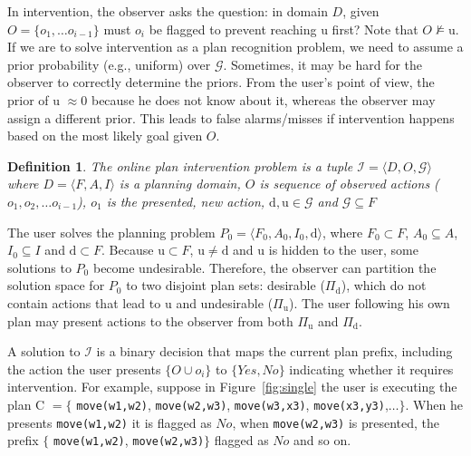 \documentclass[doctor]{thesis} %
\theoremstyle{plain}
\newtheorem{definition}{Definition}
\begin{document}
In intervention, the observer asks the question: in domain $D$, given $O = \lbrace o_1, \ldots o_{i-1}\rbrace$ must $o_i$ be flagged to prevent reaching $\mathrm{u}$ first?
Note that $O\not\models\mathrm{u}$. 
If we are to solve intervention as a plan recognition problem, we need to assume a prior probability (e.g., uniform) over $\mathcal{G}$. Sometimes, it may be hard for the observer to correctly determine the priors. From the user's point of view, the prior of $\mathrm{u}$ $\approx 0$ because he does not know about it, whereas the observer may assign a different prior. This leads to false alarms/misses if intervention happens based on the most likely goal given $O$.


\theoremstyle{definition}
\begin{definition}
The \textnormal{online plan intervention problem} is a tuple $\mathcal{I} = \langle D, O, \mathcal{G} \rangle$ where $D=\langle F, A, I \rangle$ is a planning domain, 
$O$ is  sequence of observed actions ($o_1, o_2, \ldots o_{i-1}$), $o_1$ is the presented, new action, $\mathrm{d},\mathrm{u} \in \mathcal{G}$ and $\mathcal{G} \subseteq F$
\end{definition}
The user solves the planning problem $P_0=\langle F_0, A_0, I_0,\mathrm{d}\rangle$, where $F_0 \subset F$, $A_0\subseteq A$, $I_0 \subseteq I$ and $\mathrm{d}\subset F$. 
Because $\mathrm{u}\subset F$, $\mathrm{u}\neq \mathrm{d}$ and $\mathrm{u}$ is hidden to the user, some solutions to $P_0$ become undesirable. Therefore, the observer can partition the solution space for $P_0$ to two disjoint plan sets: desirable ($\Pi_{\mathrm{d}}$), which do not contain actions that lead to $\mathrm{u}$ and undesirable ($\Pi_{\mathrm{u}}$). The user following his own plan may present actions to the observer from both $\Pi_{\mathrm{u}}$ and $\Pi_{\mathrm{d}}$. 

A solution to $\mathcal{I}$ is a binary decision that maps the current plan prefix, including the action the user presents $\lbrace O\cup o_i\rbrace$ to $\lbrace Yes,No\rbrace$ indicating whether it requires intervention. For example, suppose in Figure~\ref{fig:single} the user is executing the plan C $=\lbrace$ \texttt{move(w1,w2)}, \texttt{move(w2,w3)}, \texttt{move(w3,x3)}, \texttt{move(x3,y3)},$\ldots \rbrace$. When he presents \texttt{move(w1,w2)} it is flagged as $No$, when \texttt{move(w2,w3)} is presented, the prefix $\lbrace$ \texttt{move(w1,w2)}, \texttt{move(w2,w3)}$\rbrace$ flagged as $No$ and so on.
\end{document}
